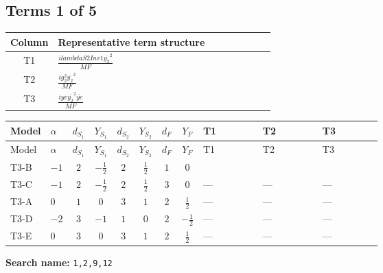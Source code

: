\documentclass[8pt]{article}
\begin{document}
\begin{landscape}
\subsection*{Terms 1 of 5}
\begin{center}
\begin{tabular}{@{}c >{\raggedright\arraybackslash}p{0.82\linewidth}@{}}
\toprule
Column & Representative term structure \\
\midrule
T1 & \(\displaystyle \frac{i lambdaS2Inv1 \overline{y_{2}}^{2}}{MF}\) \\
\midrule
T2 & \(\displaystyle \frac{i g_{2}^{2} \overline{y_{2}}^{2}}{MF}\) \\
\midrule
T3 & \(\displaystyle \frac{i ye \overline{y_{2}}^{2} \overline{ye}}{MF}\) \\
\midrule
\bottomrule
\end{tabular}
\end{center}
\smallskip
\tiny
\begin{longtable}{@{}llcccccc >{\raggedright\arraybackslash}p{0.21\linewidth} >{\raggedright\arraybackslash}p{0.21\linewidth} >{\raggedright\arraybackslash}p{0.21\linewidth}@{}}
\toprule
Model & $\alpha$ & $d_{S_1}$ & $Y_{S_1}$ & $d_{S_2}$ & $Y_{S_2}$ & $d_F$ & $Y_F$ & T1 & T2 & T3 \\
\midrule
\endfirsthead
\toprule
Model & $\alpha$ & $d_{S_1}$ & $Y_{S_1}$ & $d_{S_2}$ & $Y_{S_2}$ & $d_F$ & $Y_F$ & T1 & T2 & T3 \\
\midrule
\endhead
T3-B & $-1$ & $2$ & $-\frac{1}{2}$ & $2$ & $\frac{1}{2}$ & $1$ & $0$ & \scriptsize\adjustbox{max width=\linewidth}{$\begin{gathered} \frac{i lambdaS2Inv1 \overline{y_{2}}^{2}}{4 MF}\end{gathered}$} & \scriptsize\adjustbox{max width=\linewidth}{$\begin{gathered} \frac{3 i g_{2}^{2} \overline{y_{2}}^{2}}{8 MF}\end{gathered}$} & \scriptsize\adjustbox{max width=\linewidth}{$\begin{gathered} - \frac{i ye \overline{y_{2}}^{2} \overline{ye}}{8 MF}\end{gathered}$} \\
\midrule
T3-C & $-1$ & $2$ & $-\frac{1}{2}$ & $2$ & $\frac{1}{2}$ & $3$ & $0$ & --- & --- & --- \\
\midrule
T3-A & $0$ & $1$ & $0$ & $3$ & $1$ & $2$ & $\frac{1}{2}$ & --- & --- & --- \\
\midrule
T3-D & $-2$ & $3$ & $-1$ & $1$ & $0$ & $2$ & $-\frac{1}{2}$ & --- & --- & --- \\
\midrule
T3-E & $0$ & $3$ & $0$ & $3$ & $1$ & $2$ & $\frac{1}{2}$ & --- & --- & --- \\
\midrule
\bottomrule
\end{longtable}
\clearpage
\noindent\textbf{Search name: }\texttt{1,2,9,12}\par\smallskip

\end{landscape}
\end{document}
